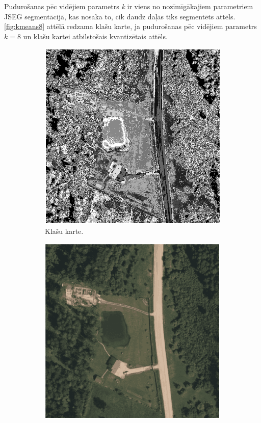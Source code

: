 \documentclass[12pt,paper=a4]{report}
\begin{document}
Pudurošanas pēc vidējiem parametrs \textit{k} ir viens no nozīmīgākajiem parametriem JSEG segmentācijā, kas nosaka to, cik daudz daļās tiks segmentēts attēls. \ref{fig:kmeans8} attēlā redzama klašu karte, ja pudurošanas pēc vidējiem parametrs $k=8$ un klašu kartei atbilstošais kvantizētais attēls.
\begin{figure}[h!]
\centering
\begin{subfigure}[b]{.4\linewidth}
\includegraphics[width=\linewidth]{map16part}
\caption{Klašu karte.}
\label{kmeans16map}
\end{subfigure}
\begin{subfigure}[b]{.4\linewidth}
\includegraphics[width=\linewidth]{ImgQ16part}

\end{subfigure}
\end{figure}
\end{document}
